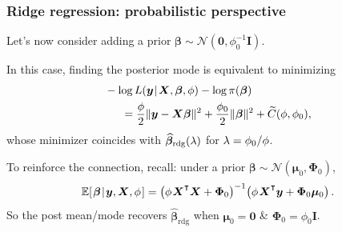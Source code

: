 \documentclass[18pt]{beamer}
\newcommand{\defineTightSpacing}{%
	\setlength{\abovedisplayskip}{.25\baselineskip}%
	\setlength{\belowdisplayskip}{.25\baselineskip}%
}
\newcommand{\given}{\thinnerspace | \thinnerspace}
\newcommand{\transpose}{\text{\raisebox{.5ex}{$\intercal$}}}
\newcommand{\thinnerspace}{\mskip.5\thinmuskip}
\newcommand{\expectation}{\mathbb{E}}
\newcommand{\normalDist}{\mathcal{N}}
\newcommand{\density}{\pi}
\newcommand{\likelihood}{L}
\newcommand{\by}{\bm{y}}
\newcommand{\bX}{\bm{X}}
\newcommand{\bmu}{\bm{\mu}}
\newcommand{\bbeta}{\bm{\beta}}
\newcommand{\Id}{\bm{I}}
\newcommand{\bPhi}{\bm{\Phi}}
\begin{document}
\begin{frame}
\frametitle{Ridge regression: probabilistic perspective}
Let's now consider adding a prior $\bbeta \sim \normalDist(\bm{0}, \phi_0^{-1} \Id)$. 

\smallskip
In this case, finding the posterior mode is equivalent to minimizing
\begin{equation*} \defineTightSpacing%
\begin{aligned}
&- \log \likelihood(\by \given \bX, \bbeta, \phi) - \log \density(\bbeta)\\
	&\hspace*{1.5em}= \frac{\phi}{2} \| \by - \bX \bbeta \|^2 + \frac{\phi_0}{2} \| \bbeta \|^2 + \widetilde{C}(\phi, \phi_0),
\end{aligned}
\end{equation*}
whose minimizer coincides with $\widehat{\bbeta}_{\mathrm{rdg}}(\penaltyParam)$ for $\lambda = \phi_0 / \phi$.

\smallskip
To reinforce the connection, recall: under a prior $\bbeta \sim \normalDist(\bmu_0, \bPhi_0)$,
\begin{equation*} \defineTightSpacing%
\expectation\!\left[
	\thinnerspace \bbeta \given \by, \bX, \phi \thinnerspace
\right]
	= \left( \phi \thinnerspace \bX^\transpose \bX + \bPhi_0 \right)^{-1} \! \left( \phi \thinnerspace \bX^\transpose \bm{y} + \bPhi_0 \bmu_0 \right).
\end{equation*}
So the post mean/mode recovers $\widehat{\bbeta}_{\mathrm{rdg}}$ when $\bmu_0 = \bm{0}$ \& $\bPhi_0 = \phi_0 \Id$.
\end{frame}
\end{document}
